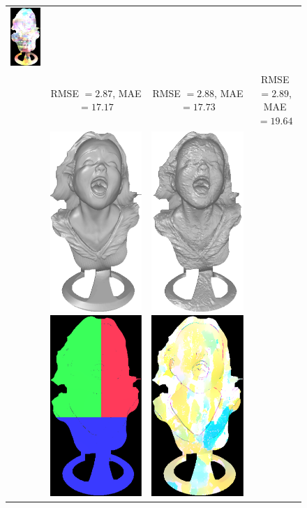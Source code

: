 \begin{figure}
{\begin{tabular}{cccc}
\includegraphics[height=0.25\linewidth]{figures/result/comp_fusion_love_albedo.pdf} \\
& {\small RMSE $= 2.87$, MAE $=17.17$} & {\small RMSE $= 2.88$, MAE $=17.73$} & {\small RMSE $=2.89$, MAE $=19.64$} \\
\multirow{-15}{*}{\parbox[t]{2.5mm}{}} &    
 \includegraphics[height=0.25\linewidth]{figures/result/comp_ratio_rgb_shape.pdf}
 \includegraphics[height=0.25\linewidth]{figures/result/comp_ratio_rgb_albedo.pdf} &
 \includegraphics[height=0.25\linewidth]{figures/result/comp_ratio_pattern_shape.pdf} 
\includegraphics[height=0.25\linewidth]{figures/result/comp_ratio_pattern_albedo.pdf} &

\end{tabular}}
\end{figure}
